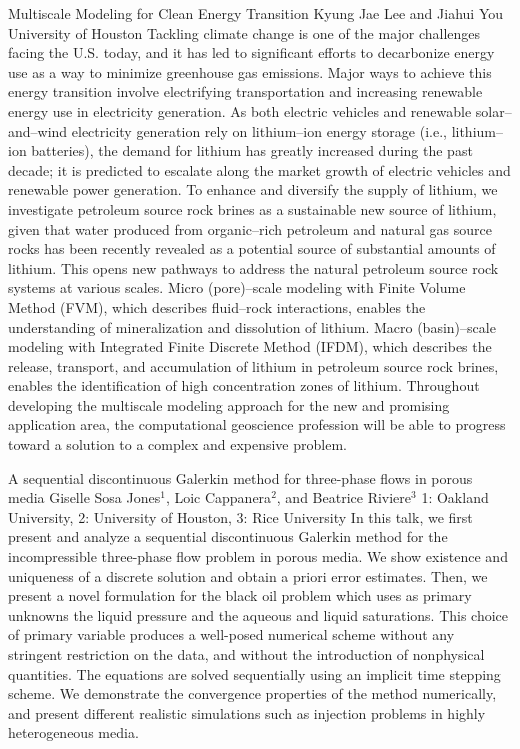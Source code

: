 \vspace{1.5ex}
\abs
{Multiscale Modeling for Clean Energy Transition}
{Kyung Jae Lee and Jiahui You}
{University of Houston}
{Tackling climate change is one of the major challenges facing the U.S. today, and it has led to significant efforts to decarbonize energy use as a way to minimize greenhouse gas emissions. Major ways to achieve this energy transition involve electrifying transportation and increasing renewable energy use in electricity generation. As both electric vehicles and renewable solar–and–wind electricity generation rely on lithium–ion energy storage (i.e., lithium–ion batteries), the demand for lithium has greatly increased during the past decade; it is predicted to escalate along the market growth of electric vehicles and renewable power generation. To enhance and diversify the supply of lithium, we investigate petroleum source rock brines as a sustainable new source of lithium, given that water produced from organic–rich petroleum and natural gas source rocks has been recently revealed as a potential source of substantial amounts of lithium. This opens new pathways to address the natural petroleum source rock systems at various scales. Micro (pore)–scale modeling with Finite Volume Method (FVM), which describes fluid–rock interactions, enables the understanding of mineralization and dissolution of lithium. Macro (basin)–scale modeling with Integrated Finite Discrete Method (IFDM), which describes the release, transport, and accumulation of lithium in petroleum source rock brines, enables the identification of high concentration zones of lithium. Throughout developing the multiscale modeling approach for the new and promising application area, the computational geoscience profession will be able to progress toward a solution to a complex and expensive problem.}


\vspace{1.5ex}
\abs
{A sequential discontinuous Galerkin method for three-phase flows in porous media}
{Giselle Sosa Jones$^{1}$, Loic Cappanera$^{2}$, and Beatrice Riviere$^{3}$}
{1: Oakland University, 2: University of Houston, 3: Rice University}
{In this talk, we first present and analyze a sequential discontinuous Galerkin method for the incompressible three-phase flow problem in porous media. We show existence and uniqueness of a discrete solution and obtain a priori error estimates. Then, we present a novel formulation for the black oil problem which uses as primary unknowns the liquid pressure and the aqueous and liquid saturations. This choice of primary variable produces a well-posed numerical scheme without any stringent restriction on the data, and without the introduction of nonphysical quantities. The equations are solved sequentially using an implicit time stepping scheme. We demonstrate the convergence properties of the method numerically, and present different realistic simulations such as injection problems in highly heterogeneous media.}


